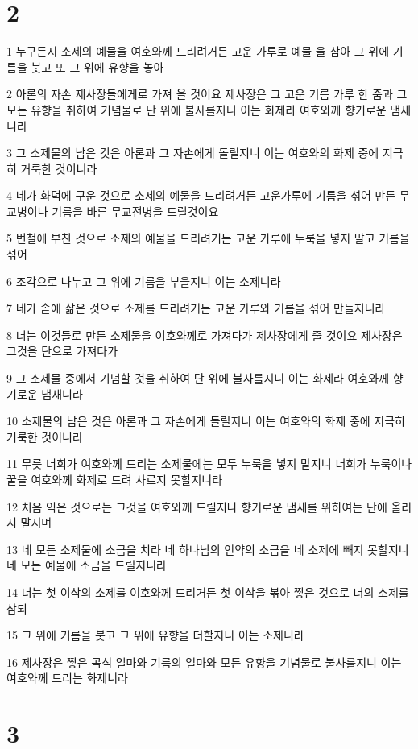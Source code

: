 \chapter{2}

\par 1 누구든지 소제의 예물을 여호와께 드리려거든 고운 가루로 예물 을 삼아 그 위에 기름을 붓고 또 그 위에 유향을 놓아
\par 2 아론의 자손 제사장들에게로 가져 올 것이요 제사장은 그 고운 기름 가루 한 줌과 그 모든 유향을 취하여 기념물로 단 위에 불사를지니 이는 화제라 여호와께 향기로운 냄새니라
\par 3 그 소제물의 남은 것은 아론과 그 자손에게 돌릴지니 이는 여호와의 화제 중에 지극히 거룩한 것이니라
\par 4 네가 화덕에 구운 것으로 소제의 예물을 드리려거든 고운가루에 기름을 섞어 만든 무교병이나 기름을 바른 무교전병을 드릴것이요
\par 5 번철에 부친 것으로 소제의 예물을 드리려거든 고운 가루에 누룩을 넣지 말고 기름을 섞어
\par 6 조각으로 나누고 그 위에 기름을 부을지니 이는 소제니라
\par 7 네가 솥에 삶은 것으로 소제를 드리려거든 고운 가루와 기름을 섞어 만들지니라
\par 8 너는 이것들로 만든 소제물을 여호와께로 가져다가 제사장에게 줄 것이요 제사장은 그것을 단으로 가져다가
\par 9 그 소제물 중에서 기념할 것을 취하여 단 위에 불사를지니 이는 화제라 여호와께 향기로운 냄새니라
\par 10 소제물의 남은 것은 아론과 그 자손에게 돌릴지니 이는 여호와의 화제 중에 지극히 거룩한 것이니라
\par 11 무릇 너희가 여호와께 드리는 소제물에는 모두 누룩을 넣지 말지니 너희가 누룩이나 꿀을 여호와께 화제로 드려 사르지 못할지니라
\par 12 처음 익은 것으로는 그것을 여호와께 드릴지나 향기로운 냄새를 위하여는 단에 올리지 말지며
\par 13 네 모든 소제물에 소금을 치라 네 하나님의 언약의 소금을 네 소제에 빼지 못할지니 네 모든 예물에 소금을 드릴지니라
\par 14 너는 첫 이삭의 소제를 여호와께 드리거든 첫 이삭을 볶아 찧은 것으로 너의 소제를 삼되
\par 15 그 위에 기름을 붓고 그 위에 유향을 더할지니 이는 소제니라
\par 16 제사장은 찧은 곡식 얼마와 기름의 얼마와 모든 유향을 기념물로 불사를지니 이는 여호와께 드리는 화제니라

\chapter{3}

